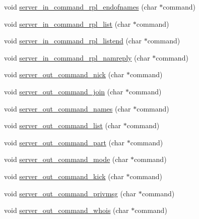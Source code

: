\begin{DoxyCompactItemize}
\item 
void \hyperlink{G-2313-06-P2__client__function__handlers_8h_a11fdd753a098bb69dc7ca93a89433abb}{server\+\_\+in\+\_\+command\+\_\+rpl\+\_\+endofnames} (char $\ast$command)
\item 
void \hyperlink{G-2313-06-P2__client__function__handlers_8h_a032cc47903f14a4fbdcec9e54f6a8e4a}{server\+\_\+in\+\_\+command\+\_\+rpl\+\_\+list} (char $\ast$command)
\item 
void \hyperlink{G-2313-06-P2__client__function__handlers_8h_ad4a1e3d492ae6907a5e15e92cb9b69f7}{server\+\_\+in\+\_\+command\+\_\+rpl\+\_\+listend} (char $\ast$command)
\item 
void \hyperlink{G-2313-06-P2__client__function__handlers_8h_a770ed57ba6c48c4a349208439e3f19ef}{server\+\_\+in\+\_\+command\+\_\+rpl\+\_\+namreply} (char $\ast$command)
\item 
void \hyperlink{G-2313-06-P2__client__function__handlers_8h_a43f3e63fcf23bd087e02911f79b789b0}{server\+\_\+out\+\_\+command\+\_\+nick} (char $\ast$command)
\item 
void \hyperlink{G-2313-06-P2__client__function__handlers_8h_a49e60d29aef3725ab2a91c7f99e61021}{server\+\_\+out\+\_\+command\+\_\+join} (char $\ast$command)
\item 
void \hyperlink{G-2313-06-P2__client__function__handlers_8h_ab2f3bd779063c27074a6cdce0f98ee0a}{server\+\_\+out\+\_\+command\+\_\+names} (char $\ast$command)
\item 
void \hyperlink{G-2313-06-P2__client__function__handlers_8h_a0a66dad6908cd303ae31f06dda298e5f}{server\+\_\+out\+\_\+command\+\_\+list} (char $\ast$command)
\item 
void \hyperlink{G-2313-06-P2__client__function__handlers_8h_a39f81214b8394e2b7fb0989e5fe10fb3}{server\+\_\+out\+\_\+command\+\_\+part} (char $\ast$command)
\item 
void \hyperlink{G-2313-06-P2__client__function__handlers_8h_afa583197101ff2eb07ab93ccd10da962}{server\+\_\+out\+\_\+command\+\_\+mode} (char $\ast$command)
\item 
void \hyperlink{G-2313-06-P2__client__function__handlers_8h_a4e94d9864089e10109fc24ce92d4368b}{server\+\_\+out\+\_\+command\+\_\+kick} (char $\ast$command)
\item 
void \hyperlink{G-2313-06-P2__client__function__handlers_8h_a4c442d20949a3a3e84551a5f23ce8263}{server\+\_\+out\+\_\+command\+\_\+privmsg} (char $\ast$command)
\item 
void \hyperlink{G-2313-06-P2__client__function__handlers_8h_af34c02fb3b13802e2c457a302c66cb89}{server\+\_\+out\+\_\+command\+\_\+whois} (char $\ast$command)

\end{DoxyCompactItemize}
